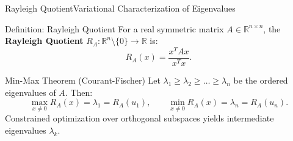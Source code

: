 \documentclass[10pt, aspectratio=169]{beamer}
\newcommand{\hl}[1]{{\color{amber}\textbf{#1}}}
\begin{document}
\begin{frame}{Rayleigh Quotient}{Variational Characterization of Eigenvalues}
  \begin{mathdef}{Definition: Rayleigh Quotient}
    For a real symmetric matrix $A \in \mathbb{R}^{n \times n}$, the \hl{Rayleigh Quotient} $R_A : \mathbb{R}^n \setminus \{0\} \to \mathbb{R}$ is:
    \[
      R_A(x) = \frac{x^T A x}{x^T x}.
    \]
  \end{mathdef}

  \vspace*{0.1cm}

  \begin{maththeorem}{Min-Max Theorem (Courant-Fischer)}
    \small
    Let $\lambda_1 \ge \lambda_2 \ge \dots \ge \lambda_n$ be the ordered eigenvalues of $A$. Then:
    \[
      \max_{x \neq 0} R_A(x) = \lambda_1 = R_A(u_1), \qquad \min_{x \neq 0} R_A(x) = \lambda_n = R_A(u_n).
    \]
    Constrained optimization over orthogonal subspaces yields intermediate eigenvalues $\lambda_k$.
  \end{maththeorem}
\end{frame}
\end{document}
